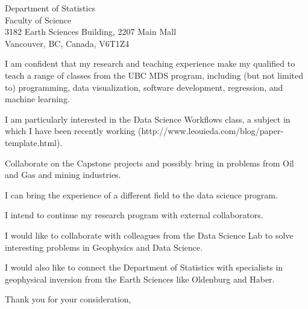 \documentclass[11pt]{letter}
\begin{document}
\begin{letter}{
    Department of Statistics
    \\
    Faculty of Science
    \\
    3182 Earth Sciences Building, 2207 Main Mall
    \\
    Vancouver, BC, Canada, V6T1Z4
}

I am confident that my research and teaching experience make my qualified to
teach a range of classes from the UBC MDS program, including (but not limited
to) programming, data visualization, software development, regression, and
machine learning.

I am particularly interested in the Data Science Workflows class, a subject in
which I have been recently working
(http://www.leouieda.com/blog/paper-template.html).

Collaborate on the Capstone projects and possibly bring in problems from Oil
and Gas and mining industries.

I can bring the experience of a different field to the data science program.

I intend to continue my research program with external collaborators.

I would like to collaborate with colleagues from the Data Science Lab to solve
interesting problems in Geophysics and Data Science.

I would also like to connect the Department of Statistics with specialists in
geophysical inversion from the Earth Sciences like Oldenburg and Haber.


\closing{Thank you for your consideration,}

\end{letter}
\end{document}
